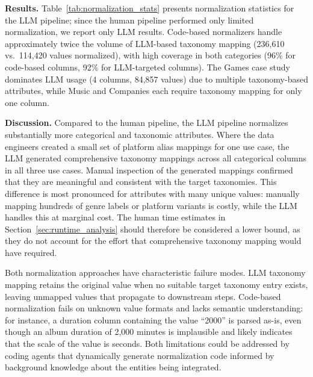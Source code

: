 \textbf{Results.}
\label{sec:norm_results}
Table~\ref{tab:normalization_stats} presents normalization statistics for the LLM pipeline; since the human pipeline performed only limited normalization, we report only LLM results.
Code-based normalizers handle approximately twice the volume of LLM-based taxonomy mapping (236,610 vs.\ 114,420 values normalized), with high coverage in both categories (96\% for code-based columns, 92\% for LLM-targeted columns). The Games case study dominates LLM usage (4 columns, 84,857 values) due to multiple taxonomy-based attributes, while Music and Companies each require taxonomy mapping for only one column.

\textbf{Discussion.}
\label{sec:norm_limitations}
Compared to the human pipeline, the LLM pipeline normalizes substantially more categorical and taxonomic attributes. Where the data engineers created a small set of platform alias mappings for one use case, the LLM generated comprehensive taxonomy mappings across all categorical columns in all three use cases. Manual inspection of the generated mappings confirmed that they are meaningful and consistent with the target taxonomies. This difference is most pronounced for attributes with many unique values: manually mapping hundreds of genre labels or platform variants is costly, while the LLM handles this at marginal cost. The human time estimates in Section~\ref{sec:runtime_analysis} should therefore be considered a lower bound, as they do not account for the effort that comprehensive taxonomy mapping would have required.

Both normalization approaches have characteristic failure modes. LLM taxonomy mapping retains the original value when no suitable target taxonomy entry exists, leaving unmapped values that propagate to downstream steps. Code-based normalization fails on unknown value formats and lacks semantic understanding: for instance, a duration column containing the value ``2000'' is parsed as-is, even though an album duration of 2,000 minutes is implausible and likely indicates that the scale of the value is seconds. Both limitations could be addressed by coding agents that dynamically generate normalization code informed by background knowledge about the entities being integrated.


